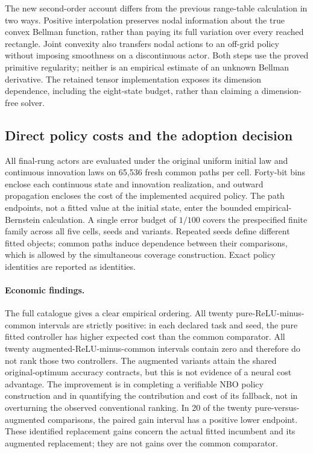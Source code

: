 The new second-order account differs from the previous range-table calculation in two ways. Positive interpolation preserves nodal information about the true convex Bellman function, rather than paying its full variation over every reached rectangle. Joint convexity also transfers nodal actions to an off-grid policy without imposing smoothness on a discontinuous actor. Both steps use the proved primitive regularity; neither is an empirical estimate of an unknown Bellman derivative. The retained tensor implementation exposes its dimension dependence, including the eight-state budget, rather than claiming a dimension-free solver.

\subsection{Direct policy costs and the adoption decision}
All final-rung actors are evaluated under the original uniform initial law and continuous innovation laws on 65,536 fresh common paths per cell. Forty-bit bins enclose each continuous state and innovation realization, and outward propagation encloses the cost of the implemented acquired policy. The path endpoints, not a fitted value at the initial state, enter the bounded empirical-Bernstein calculation. A single error budget of $1/100$ covers the prespecified finite family across all five cells, seeds and variants. Repeated seeds define different fitted objects; common paths induce dependence between their comparisons, which is allowed by the simultaneous coverage construction. Exact policy identities are reported as identities.



\paragraph{Economic findings.}
The full catalogue gives a clear empirical ordering. All twenty pure-ReLU-minus-common intervals are strictly positive: in each declared task and seed, the pure fitted controller has higher expected cost than the common comparator. All twenty augmented-ReLU-minus-common intervals contain zero and therefore do not rank those two controllers. The augmented variants attain the shared original-optimum accuracy contracts, but this is not evidence of a neural cost advantage. The improvement is in completing a verifiable NBO policy construction and in quantifying the contribution and cost of its fallback, not in overturning the observed conventional ranking. In 20 of the twenty pure-versus-augmented comparisons, the paired gain interval has a positive lower endpoint. These identified replacement gains concern the actual fitted incumbent and its augmented replacement; they are not gains over the common comparator.



